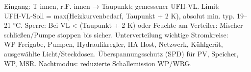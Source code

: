 \markdownRendererUlEndTight \markdownRendererInterblockSeparator
{}
\markdownRendererSectionEnd \markdownRendererSectionBegin
{}\markdownRendererInterblockSeparator
{}\markdownRendererUlBeginTight
\markdownRendererUlItem Eingang: T innen, r.F. innen → Taupunkt; gemessener UFH‑VL.\markdownRendererUlItemEnd 
\markdownRendererUlItem Limit: UFH‑VL‑Soll = max(Heizkurvenbedarf, Taupunkt + 2 K), absolut min. typ. 19–21 °C.\markdownRendererUlItemEnd 
\markdownRendererUlItem Sperre: Bei VL < (Taupunkt + 2 K) oder Feuchte am Verteiler: Mischer schließen/Pumpe stoppen bis sicher.\markdownRendererUlItemEnd 
\markdownRendererUlEndTight \markdownRendererInterblockSeparator
{}
\markdownRendererSectionEnd \markdownRendererSectionBegin
{}\markdownRendererInterblockSeparator
{}\markdownRendererUlBeginTight
\markdownRendererUlItem Unterverteilung wichtige Stromkreise: WP‑Freigabe, Pumpen, Hydraulikregler, HA‑Host, Netzwerk, Kühlgerät, ausgewählte Licht/Steckdosen.\markdownRendererUlItemEnd 
\markdownRendererUlItem Überspannungsschutz (SPD) für PV, Speicher, WP, MSR.\markdownRendererUlItemEnd 
\markdownRendererUlItem Nachtmodus: reduzierte Schallemission WP/WRG.\markdownRendererUlItemEnd 
\markdownRendererUlEndTight 
\markdownRendererSectionEnd 
\markdownRendererSectionEnd \markdownRendererDocumentEnd